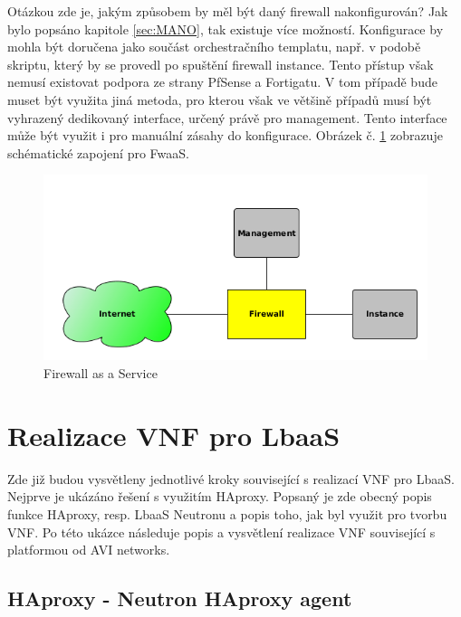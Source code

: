 Otázkou zde je, jakým způsobem by měl být daný firewall nakonfigurován? Jak bylo popsáno kapitole \ref{sec:MANO}, tak existuje více možností. Konfigurace by mohla být doručena jako součást orchestračního templatu, např. v podobě skriptu, který by se provedl po spuštění firewall instance. Tento přístup však nemusí existovat podpora ze strany PfSense a Fortigatu. V tom případě bude muset být využita jiná metoda, pro kterou však ve většině případů musí být vyhrazený dedikovaný interface, určený právě pro management. Tento interface může být využit i pro manuální zásahy do konfigurace. Obrázek č. \ref{fig:firewall} zobrazuje schématické zapojení pro FwaaS.

\begin{figure}[h]
\begin{centering}
\includegraphics[scale=0.6]{images/firewall}
\par\end{centering}
\caption{Firewall as a Service\label{fig:firewall}}
\end{figure}


\section{Realizace VNF pro LbaaS} \label{sec:realizace_lbaas}

Zde již budou vysvětleny jednotlivé kroky související s realizací VNF pro LbaaS. Nejprve je ukázáno řešení s využitím HAproxy. Popsaný je zde obecný popis funkce HAproxy, resp. LbaaS Neutronu a popis toho, jak byl využit pro tvorbu VNF. Po této ukázce následuje popis a vysvětlení realizace VNF související s platformou od AVI networks.

\subsection{HAproxy - Neutron HAproxy agent}

